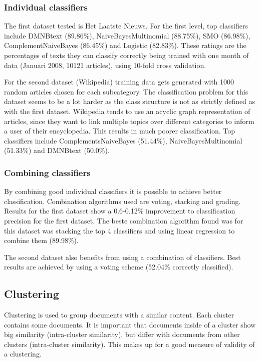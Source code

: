 \documentclass[twocolumn]{phdsymp} %
\begin{document}
\subsubsection{Individual classifiers}
The first dataset tested is Het Laatste Nieuws. For the first level, top classifiers include DMNBtext (89.86\%), NaiveBayesMultinomial (88.75\%), SMO (86.98\%), ComplementNaiveBayes (86.45\%) and Logistic (82.83\%). These ratings are the percentages of texts they can classify correctly being trained with one month of data (Januari 2008, 10121 articles), using 10-fold cross validation. 

For the second dataset (Wikipedia) training data gets generated with 1000 random articles chosen for each subcategory. The classification problem for this dataset seems to be a lot harder as the class structure is not as strictly defined as with the first dataset. Wikipedia tends to use an acyclic graph representation of articles, since they want to link multiple topics over different categories to inform a user of their encyclopedia.  This results in much poorer classification. Top classifiers include ComplementsNaiveBayes (51.44\%), NaiveBayesMultinomial (51.33\%) and DMNBtext (50.0\%).

\subsubsection{Combining classifiers}
By combining good individual classifiers it is possible to achieve better classification. Combination algorithms used are voting, stacking and grading. Results for the first dataset show a 0.6-0.12\% improvement to classification precision for the first dataset. The beste combination algorithm found was for this dataset was stacking the top 4 classifiers and using linear regression to combine them (89.98\%).

The second dataset also benefits from using a combination of classifiers. Best results are achieved by using a voting scheme (52.04\% correctly classified).

\subsection{Clustering}
Clustering is used to group documents with a similar content. Each cluster contains some documents. It is important that documents inside of a cluster show big similarity (intra-cluster similarity), but differ with documents from other clusters (intra-cluster similarity). This makes up for a good measure of validity of a clustering. 
\end{document}
